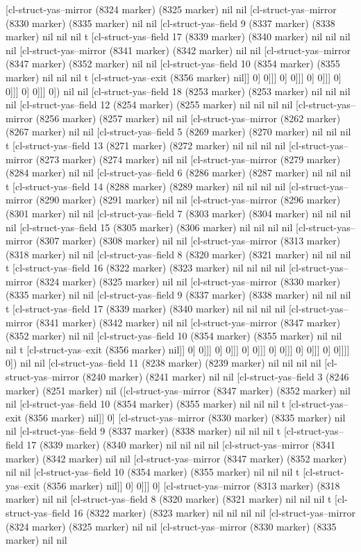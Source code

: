 {{[cl-struct-yas--mirror (8324 marker) (8325 marker) nil nil [cl-struct-yas--mirror (8330 marker) (8335 marker) nil nil [cl-struct-yas--field 9 (8337 marker) (8338 marker) nil nil nil t [cl-struct-yas--field 17 (8339 marker) (8340 marker) nil nil nil nil [cl-struct-yas--mirror (8341 marker) (8342 marker) nil nil [cl-struct-yas--mirror (8347 marker) (8352 marker) nil nil [cl-struct-yas--field 10 (8354 marker) (8355 marker) nil nil nil t [cl-struct-yas--exit (8356 marker) nil]] 0] 0]]] 0] 0]]] 0] 0]]] 0] 0]]] 0] 0]]] 0]) nil nil [cl-struct-yas--field 18 (8253 marker) (8253 marker) nil nil nil nil [cl-struct-yas--field 12 (8254 marker) (8255 marker) nil nil nil nil [cl-struct-yas--mirror (8256 marker) (8257 marker) nil nil [cl-struct-yas--mirror (8262 marker) (8267 marker) nil nil [cl-struct-yas--field 5 (8269 marker) (8270 marker) nil nil nil t [cl-struct-yas--field 13 (8271 marker) (8272 marker) nil nil nil nil [cl-struct-yas--mirror (8273 marker) (8274 marker) nil nil [cl-struct-yas--mirror (8279 marker) (8284 marker) nil nil [cl-struct-yas--field 6 (8286 marker) (8287 marker) nil nil nil t [cl-struct-yas--field 14 (8288 marker) (8289 marker) nil nil nil nil [cl-struct-yas--mirror (8290 marker) (8291 marker) nil nil [cl-struct-yas--mirror (8296 marker) (8301 marker) nil nil [cl-struct-yas--field 7 (8303 marker) (8304 marker) nil nil nil nil [cl-struct-yas--field 15 (8305 marker) (8306 marker) nil nil nil nil [cl-struct-yas--mirror (8307 marker) (8308 marker) nil nil [cl-struct-yas--mirror (8313 marker) (8318 marker) nil nil [cl-struct-yas--field 8 (8320 marker) (8321 marker) nil nil nil t [cl-struct-yas--field 16 (8322 marker) (8323 marker) nil nil nil nil [cl-struct-yas--mirror (8324 marker) (8325 marker) nil nil [cl-struct-yas--mirror (8330 marker) (8335 marker) nil nil [cl-struct-yas--field 9 (8337 marker) (8338 marker) nil nil nil t [cl-struct-yas--field 17 (8339 marker) (8340 marker) nil nil nil nil [cl-struct-yas--mirror (8341 marker) (8342 marker) nil nil [cl-struct-yas--mirror (8347 marker) (8352 marker) nil nil [cl-struct-yas--field 10 (8354 marker) (8355 marker) nil nil nil t [cl-struct-yas--exit (8356 marker) nil]] 0] 0]]] 0] 0]]] 0] 0]]] 0] 0]]] 0] 0]]] 0] 0]]]] 0]) nil nil [cl-struct-yas--field 11 (8238 marker) (8239 marker) nil nil nil nil [cl-struct-yas--mirror (8240 marker) (8241 marker) nil nil [cl-struct-yas--field 3 (8246 marker) (8251 marker) nil ([cl-struct-yas--mirror (8347 marker) (8352 marker) nil nil [cl-struct-yas--field 10 (8354 marker) (8355 marker) nil nil nil t [cl-struct-yas--exit (8356 marker) nil]] 0] [cl-struct-yas--mirror (8330 marker) (8335 marker) nil nil [cl-struct-yas--field 9 (8337 marker) (8338 marker) nil nil nil t [cl-struct-yas--field 17 (8339 marker) (8340 marker) nil nil nil nil [cl-struct-yas--mirror (8341 marker) (8342 marker) nil nil [cl-struct-yas--mirror (8347 marker) (8352 marker) nil nil [cl-struct-yas--field 10 (8354 marker) (8355 marker) nil nil nil t [cl-struct-yas--exit (8356 marker) nil]] 0] 0]]] 0] [cl-struct-yas--mirror (8313 marker) (8318 marker) nil nil [cl-struct-yas--field 8 (8320 marker) (8321 marker) nil nil nil t [cl-struct-yas--field 16 (8322 marker) (8323 marker) nil nil nil nil [cl-struct-yas--mirror (8324 marker) (8325 marker) nil nil [cl-struct-yas--mirror (8330 marker) (8335 marker) nil nil }}
